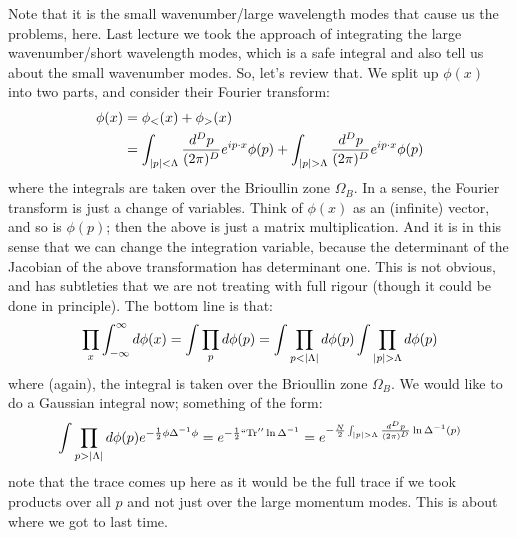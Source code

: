 Note that it is the small wavenumber/large wavelength modes that cause us the problems, here. Last lecture we took the approach of integrating the large wavenumber/short wavelength modes, which is a safe integral and also tell us about the small wavenumber modes. So, let's review that. We split up $\phi(x)$ into two parts, and consider their Fourier transform:
\begin{equation}
    \begin{split}
        \phi(x) &= \phi_<(x) + \phi_>(x)
        \\ &= \int_{\abs{p}< \Lambda} \frac{d^Dp}{(2\pi)^D}e^{ip \cdot x}\phi(p) + \int_{\abs{p} > \Lambda} \frac{d^Dp}{(2\pi)^D} e^{ip \cdot x}\phi(p)
    \end{split}
\end{equation}
where the integrals are taken over the Brioullin zone $\Omega_B$. In a sense, the Fourier transform is just a change of variables. Think of $\phi(x)$ as an (infinite) vector, and so is $\phi(p)$; then the above is just a matrix multiplication. And it is in this sense that we can change the integration variable, because the determinant of the Jacobian of the above transformation has determinant one. This is not obvious, and has subtleties that we are not treating with full rigour (though it could be done in principle). The bottom line is that:
\begin{equation}
    \prod_x \int_{-\infty}^\infty d\phi(x) = \int \prod_p d\phi(p) = \int \prod_{p < \abs{\Lambda}}d\phi(p)\int \prod_{\abs{p} > \Lambda} d\phi(p)
\end{equation}
where (again), the integral is taken over the Brioullin zone $\Omega_B$. We would like to do a Gaussian integral now; something of the form:
\begin{equation}
    \int \prod_{p > \abs{\Lambda}} d\phi(p) e^{-\frac{1}{2}\phi \Delta^{-1}\phi} = e^{-\frac{1}{2}``\Tr''\ln\Delta^{-1}} = e^{-\frac{N}{2}\int_{\abs{p}> \Lambda}\frac{d^Dp}{(2\pi)^D} \ln \Delta^{-1}(p)}
\end{equation}
note that the trace comes up here as it would be the full trace if we took products over all $p$ and not just over the large momentum modes. This is about where we got to last time.

